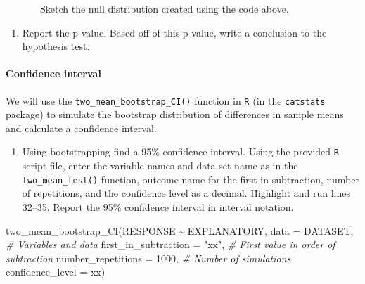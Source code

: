 \documentclass[
]{report}
\newenvironment{Shaded}{\begin{snugshade}}{\end{snugshade}}
\newcommand{\AttributeTok}[1]{\textcolor[rgb]{0.77,0.63,0.00}{#1}}
\newcommand{\CommentTok}[1]{\textcolor[rgb]{0.56,0.35,0.01}{\textit{#1}}}
\newcommand{\DecValTok}[1]{\textcolor[rgb]{0.00,0.00,0.81}{#1}}
\newcommand{\FunctionTok}[1]{\textcolor[rgb]{0.00,0.00,0.00}{#1}}
\newcommand{\NormalTok}[1]{#1}
\newcommand{\SpecialCharTok}[1]{\textcolor[rgb]{0.00,0.00,0.00}{#1}}
\newcommand{\StringTok}[1]{\textcolor[rgb]{0.31,0.60,0.02}{#1}}
\providecommand{\tightlist}{%
  \setlength{\itemsep}{0pt}\setlength{\parskip}{0pt}}
\begin{document}
~~~~~~~Sketch the null distribution created using the code above.

\vspace{1.5in}

\begin{enumerate}
\def\labelenumi{\arabic{enumi}.}
\setcounter{enumi}{16}
\tightlist
\item
  Report the p-value. Based off of this p-value, write a conclusion to the hypothesis test.
\end{enumerate}

\vspace{0.9in}

\newpage

\hypertarget{confidence-interval-2}{%
\paragraph*{Confidence interval}\label{confidence-interval-2}}

We will use the \texttt{two\_mean\_bootstrap\_CI()} function in \texttt{R} (in the \texttt{catstats} package) to simulate the bootstrap distribution of differences in sample means and calculate a confidence interval.

\begin{enumerate}
\def\labelenumi{\arabic{enumi}.}
\setcounter{enumi}{17}
\tightlist
\item
  Using bootstrapping find a 95\% confidence interval. Using the provided \texttt{R} script file, enter the variable names and data set name as in the \texttt{two\_mean\_test()} function, outcome name for the first in subtraction, number of repetitions, and the confidence level as a decimal. Highlight and run lines 32--35. Report the 95\% confidence interval in interval notation.
\end{enumerate}

\begin{Shaded}
\begin{Highlighting}[]
\FunctionTok{two\_mean\_bootstrap\_CI}\NormalTok{(RESPONSE }\SpecialCharTok{\textasciitilde{}}\NormalTok{ EXPLANATORY, }\AttributeTok{data =}\NormalTok{ DATASET,  }\CommentTok{\# Variables and data}
                      \AttributeTok{first\_in\_subtraction =} \StringTok{"xx"}\NormalTok{, }\CommentTok{\# First value in order of subtraction}
                      \AttributeTok{number\_repetitions =} \DecValTok{1000}\NormalTok{,  }\CommentTok{\# Number of simulations}
                      \AttributeTok{confidence\_level =}\NormalTok{ xx)}
\end{Highlighting}
\end{Shaded}
\end{document}
